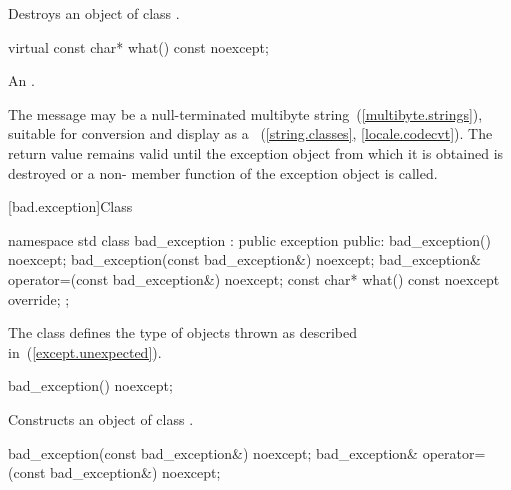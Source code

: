 \begin{itemdescr}
\pnum
\effects
Destroys an object of class
.
\end{itemdescr}

%
%
\begin{itemdecl}
virtual const char* what() const noexcept;
\end{itemdecl}

\begin{itemdescr}
\pnum
\returns
An  \ntbs.

\pnum
\remarks
The message may be a null-terminated multibyte string~(\ref{multibyte.strings}),
suitable for conversion and display as a
~(\ref{string.classes}, \ref{locale.codecvt}).
The return value remains valid until the exception object from which
it is obtained is destroyed or a non-
member function of the exception object is called.
\end{itemdescr}

[bad.exception]{Class }

%
\begin{codeblock}
namespace std {
  class bad_exception : public exception {
  public:
    bad_exception() noexcept;
    bad_exception(const bad_exception&) noexcept;
    bad_exception& operator=(const bad_exception&) noexcept;
    const char* what() const noexcept override;
  };
}
\end{codeblock}

\pnum
The class
defines the type of objects thrown as
described in~(\ref{except.unexpected}).

%
\begin{itemdecl}
bad_exception() noexcept;
\end{itemdecl}

\begin{itemdescr}
\pnum
\effects
Constructs an object of class
.
\end{itemdescr}

%
%
\begin{itemdecl}
bad_exception(const bad_exception&) noexcept;
bad_exception& operator=(const bad_exception&) noexcept;
\end{itemdecl}

